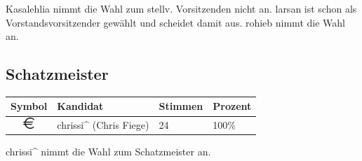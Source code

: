 \documentclass[a4paper,12pt]{scrartcl}
\begin{document}
Kasalehlia nimmt die Wahl zum stellv. Vorsitzenden nicht an. larsan ist schon
als Vorstandsvorsitzender gewählt und scheidet damit aus. rohieb nimmt die Wahl
an.

\subsection*{Schatzmeister}
\begin{tabular}{|c|l|l|l|}
  \hline
  \textbf{Symbol} & \textbf{Kandidat} & \textbf{Stimmen} & \textbf{Prozent} \\
  \hline
  \includegraphics[height=12pt]{images/mv20151206-wahl-schatzmeister-1.pdf} &
  chrissi\textasciicircum{} (Chris Fiege) & 24 & 100\% \\
  \hline
\end{tabular}

chrissi\textasciicircum{} nimmt die Wahl zum Schatzmeister an.
\end{document}
